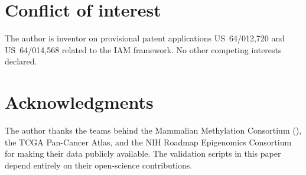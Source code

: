 \documentclass[11pt,a4paper]{article}
\begin{document}
\section*{Conflict of interest}

The author is inventor on provisional patent applications US~64/012,720 and
US~64/014,568 related to the IAM framework. No other competing interests declared.

\section*{Acknowledgments}

The author thanks the teams behind the Mammalian Methylation Consortium
(\citealt{Lu2023,Haghani2023,Lowe2018}), the TCGA Pan-Cancer Atlas,
and the NIH Roadmap Epigenomics Consortium for making their data publicly
available. The validation scripts in this paper depend entirely on their
open-science contributions.



\end{document}
